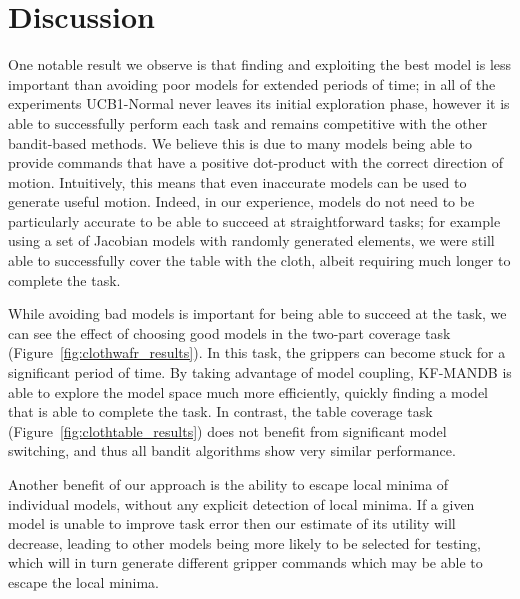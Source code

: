 \section{Discussion}

One notable result we observe is that finding and exploiting the best model is less important than avoiding poor models for extended periods of time; in all of the experiments UCB1-Normal never leaves its initial exploration phase, however it is able to successfully perform each task and remains competitive with the other bandit-based methods. We believe this is due to many models being able to provide commands that have a positive dot-product with the correct direction of motion. Intuitively, this means that even inaccurate models can be used to generate useful motion. Indeed, in our experience, models do not need to be particularly accurate to be able to succeed at straightforward tasks; for example using a set of Jacobian models with randomly generated elements, we were still able to successfully cover the table with the cloth, albeit requiring much longer to complete the task.

While avoiding bad models is important for being able to succeed at the task, we can see the effect of choosing good models in the two-part coverage task (Figure~\ref{fig:clothwafr_results}). In this task, the grippers can become stuck for a significant period of time. By taking advantage of model coupling, KF-MANDB is able to explore the model space much more efficiently, quickly finding a model that is able to complete the task. In contrast, the table coverage task (Figure~\ref{fig:clothtable_results}) does not benefit from significant model switching, and thus all bandit algorithms show very similar performance.

Another benefit of our approach is the ability to escape local minima of individual models, without any explicit detection of local minima. If a given model is unable to improve task error then our estimate of its utility will decrease, leading to other models being more likely to be selected for testing, which will in turn generate different gripper commands which may be able to escape the local minima.
